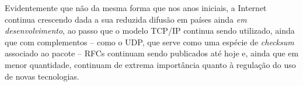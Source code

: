 \documentclass[conference]{IEEEtran}
\begin{document}
  Evidentemente que não da mesma forma que nos anos iniciais, a Internet
  continua crescendo dada a sua reduzida difusão em países ainda \emph{em
    desenvolvimento}, ao passo que o modelo TCP/IP continua sendo utilizado,
  ainda que com complementos -- como o UDP, que serve como uma espécie de
  \emph{checksum} associado ao pacote -- RFCs continuam sendo publicados até
  hoje e, ainda que em menor quantidade, continuam de extrema importância quanto
  à regulação do uso de novas tecnologias.
  











%
%
%
\end{document}
